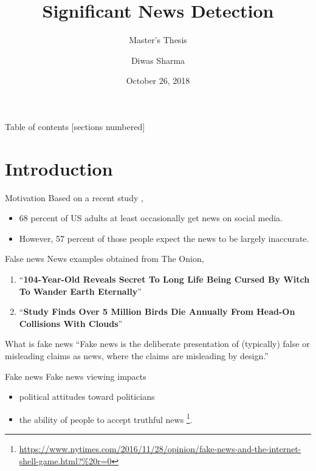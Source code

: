\documentclass[12pt]{beamer}
\title{Significant News Detection}
\subtitle{Master's Thesis}
\date{October 26, 2018}
\author{Diwas Sharma}
\institute{The University of Alabama in Huntsville}
\begin{document}
\maketitle

\begin{frame}{Table of contents}
  [sections numbered]
  \tableofcontents[hideallsubsections]
\end{frame}

\section{Introduction}

\begin{frame}{Motivation}
    Based on a recent study \autocite{matsa2018news},
    \begin{itemize}
        \item 68 percent of US adults at least occasionally get news on social media.
        \item However, 57 percent of those people expect the news to be largely inaccurate.
    \end{itemize}
\end{frame}


\begin{frame}{False news}
    News examples obtained from The Onion, \\
    \begin{enumerate}
        \item \enquote{\textbf{104-Year-Old Reveals Secret To Long Life Being Cursed By Witch To Wander Earth Eternally}} \\
        \item \enquote{\textbf{Study Finds Over 5 Million Birds Die Annually From Head-On Collisions With Clouds}} \\
    \end{enumerate}
\end{frame}

\begin{frame}{What is fake news}
    \enquote{Fake news is the deliberate presentation of (typically) false or misleading claims as news, where the claims are misleading by design.} \autocite{gelfert2018fake}
\end{frame}

\begin{frame}{Fake news }
    Fake news viewing impacts \\
    \begin{itemize}
        \item political attitudes toward politicians \autocite{balmas2014fake}
        \item the ability of people to accept truthful news \footnote{\url{https://www.nytimes.com/2016/11/28/opinion/fake-news-and-the-internet-shell-game.html?\%20r=0}}.
    \end{itemize}
\end{frame}
\end{document}
